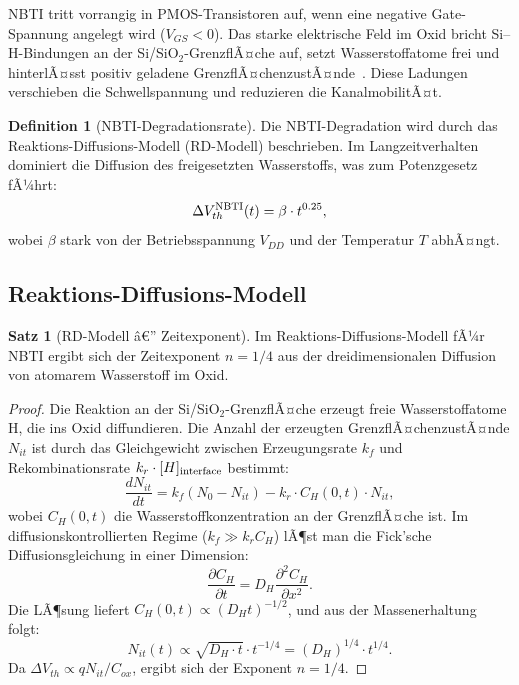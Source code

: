 ﻿\documentclass[a4paper,12pt]{article}
\theoremstyle{definition}
\newtheorem{definition}{Definition}
\newtheorem{satz}{Satz}
\begin{document}
NBTI tritt vorrangig in PMOS-Transistoren auf, wenn eine negative Gate-Spannung
angelegt wird ($V_{GS} < 0$). Das starke elektrische Feld im Oxid bricht
Si--H-Bindungen an der Si/SiO$_2$-GrenzflÃ¤che auf, setzt Wasserstoffatome frei
und hinterlÃ¤sst positiv geladene GrenzflÃ¤chenzustÃ¤nde~\cite{alam2005,stathis2006}.
Diese Ladungen verschieben die Schwellspannung und reduzieren die KanalmobilitÃ¤t.

\begin{definition}[NBTI-Degradationsrate]
	Die NBTI-Degradation wird durch das Reaktions-Diffusions-Modell (RD-Modell)
	beschrieben. Im Langzeitverhalten dominiert die Diffusion des freigesetzten
	Wasserstoffs, was zum Potenzgesetz fÃ¼hrt:
	\[
	\Delta V_{th}^{\rm NBTI}(t) = \beta \cdot t^{0.25},
	\]
	wobei $\beta$ stark von der Betriebsspannung $V_{DD}$ und der Temperatur $T$ abhÃ¤ngt.
\end{definition}

\subsection{Reaktions-Diffusions-Modell}

\begin{satz}[RD-Modell â€” Zeitexponent]
	\label{satz:nbti}
	Im Reaktions-Diffusions-Modell fÃ¼r NBTI ergibt sich der Zeitexponent $n = 1/4$
	aus der dreidimensionalen Diffusion von atomarem Wasserstoff im Oxid.
\end{satz}

\begin{proof}
	Die Reaktion an der Si/SiO$_2$-GrenzflÃ¤che erzeugt freie Wasserstoffatome H,
	die ins Oxid diffundieren. Die Anzahl der erzeugten GrenzflÃ¤chenzustÃ¤nde
	$N_{it}$ ist durch das Gleichgewicht zwischen Erzeugungsrate $k_f$ und
	Rekombinationsrate $k_r \cdot [H]_{\rm interface}$ bestimmt:
	\[
	\frac{dN_{it}}{dt} = k_f (N_0 - N_{it}) - k_r \cdot C_H(0,t) \cdot N_{it},
	\]
	wobei $C_H(0,t)$ die Wasserstoffkonzentration an der GrenzflÃ¤che ist.
	Im diffusionskontrollierten Regime ($k_f \gg k_r C_H$) lÃ¶st man die
	Fick'sche Diffusionsgleichung in einer Dimension:
	\[
	\frac{\partial C_H}{\partial t} = D_H \frac{\partial^2 C_H}{\partial x^2}.
	\]
	Die LÃ¶sung liefert $C_H(0,t) \propto (D_H t)^{-1/2}$, und aus der
	Massenerhaltung folgt:
	\[
	N_{it}(t) \propto \sqrt{D_H \cdot t} \cdot t^{-1/4} = (D_H)^{1/4} \cdot t^{1/4}.
	\]
	Da $\Delta V_{th} \propto q N_{it} / C_{ox}$, ergibt sich der Exponent $n = 1/4$.
	\qedhere
\end{proof}
\end{document}
